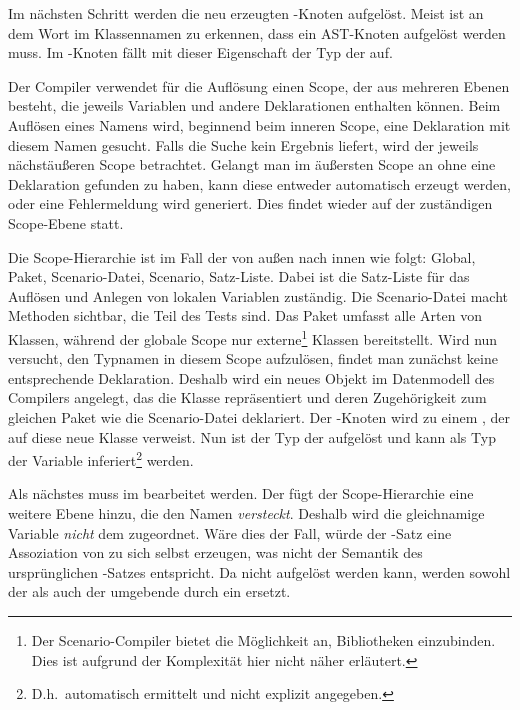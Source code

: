 

Im nächsten Schritt werden die neu erzeugten -Knoten aufgelöst.
Meist ist an dem Wort  im Klassennamen zu erkennen, dass ein AST-Knoten aufgelöst werden muss.
Im -Knoten fällt mit dieser Eigenschaft der Typ der  auf.

Der Compiler verwendet für die Auflösung einen Scope, der aus mehreren Ebenen besteht, die jeweils Variablen und andere Deklarationen enthalten können.
Beim Auflösen eines Namens wird, beginnend beim inneren Scope, eine Deklaration mit diesem Namen gesucht.
Falls die Suche kein Ergebnis liefert, wird der jeweils nächstäußeren Scope betrachtet.
Gelangt man im äußersten Scope an ohne eine Deklaration gefunden zu haben,
kann diese entweder automatisch erzeugt werden, oder eine Fehlermeldung wird generiert.
Dies findet wieder auf der zuständigen Scope-Ebene statt.

Die Scope-Hierarchie ist im Fall der  von außen nach innen wie folgt:
Global, Paket, Scenario-Datei, Scenario, Satz-Liste.
Dabei ist die Satz-Liste für das Auflösen und Anlegen von lokalen Variablen zuständig.
Die Scenario-Datei macht Methoden sichtbar, die Teil des Tests sind.
Das Paket umfasst alle Arten von Klassen, während der globale Scope nur externe\footnote{Der Scenario-Compiler bietet die Möglichkeit an, Bibliotheken einzubinden.
Dies ist aufgrund der Komplexität hier nicht näher erläutert.} Klassen bereitstellt.
Wird nun versucht, den Typnamen  in diesem Scope aufzulösen,
findet man zunächst keine entsprechende Deklaration.
Deshalb wird ein neues Objekt im Datenmodell des Compilers angelegt,
das die Klasse  repräsentiert und deren Zugehörigkeit zum gleichen Paket wie die Scenario-Datei deklariert.
Der -Knoten wird zu einem , der auf diese neue Klasse verweist.
Nun ist der Typ der  aufgelöst und kann als Typ der Variable  inferiert\footnote{D.h.\ automatisch ermittelt und nicht explizit angegeben.} werden.

Als nächstes muss  im  bearbeitet werden.
Der  fügt der Scope-Hierarchie eine weitere Ebene hinzu, die den Namen  \emph{versteckt}.
Deshalb wird die gleichnamige Variable \emph{nicht} dem  zugeordnet.
Wäre dies der Fall, würde der -Satz eine Assoziation von  zu sich selbst erzeugen,
was nicht der Semantik des ursprünglichen -Satzes entspricht.
Da  nicht aufgelöst werden kann, werden sowohl der  als auch der umgebende  durch ein  ersetzt.

